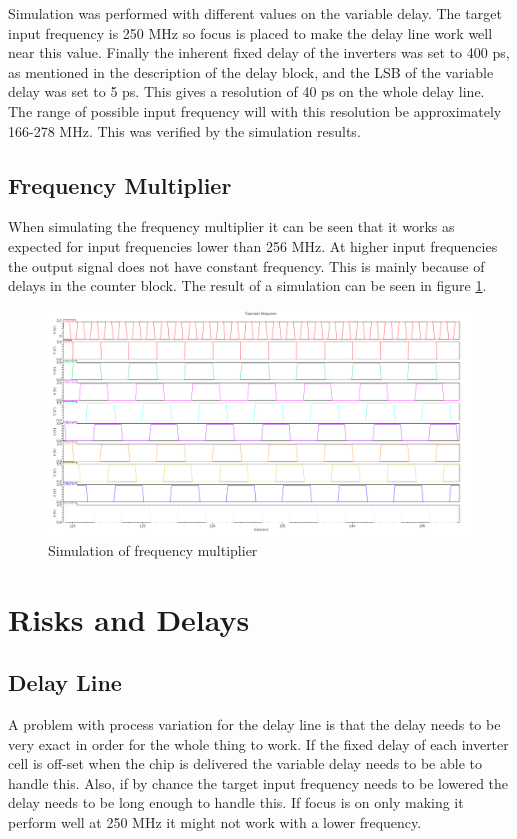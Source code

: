 \documentclass[a4paper,12pt]{article} \usepackage{graphicx}
\begin{document}
Simulation was performed with different values on the variable
delay. The target input frequency is 250 MHz so focus is placed to make
the delay line work well near this value. Finally the inherent fixed
delay of the inverters was set to 400 ps, as mentioned in the
description of the delay block, and the
LSB of the variable delay was set to 5 ps. This gives a resolution of
40 ps on the whole delay line. The range of possible input frequency
will with this resolution be approximately 166-278 MHz. This was
verified by the simulation results.

\subsection{Frequency Multiplier}
When simulating the frequency multiplier it can be seen that it works
as expected for input frequencies lower than 256 MHz. At higher input 
frequencies the output signal does not have constant frequency. This is
mainly because of delays in the counter block.
The result of a simulation can be seen in figure \ref{fig:freq_mult_sim}.
\begin{figure}[hb]
        \centering
        \includegraphics[width=\textwidth]{../Bilder/delay_line_sim.png}
        \caption{Simulation of frequency multiplier}
        \label{fig:freq_mult_sim}
\end{figure}

\section{Risks and Delays}
\subsection{Delay Line}
A problem with process variation for the delay line is that the delay
needs to be very exact in order for the whole thing to work. If the
fixed delay of each inverter cell is off-set when the chip is
delivered the variable delay needs to be able to handle this. Also,
if by chance the target input frequency needs to be lowered the delay
needs to be long enough to handle this. If focus is on only making it
perform well at 250 MHz it might not work with a lower frequency. 
\end{document}
